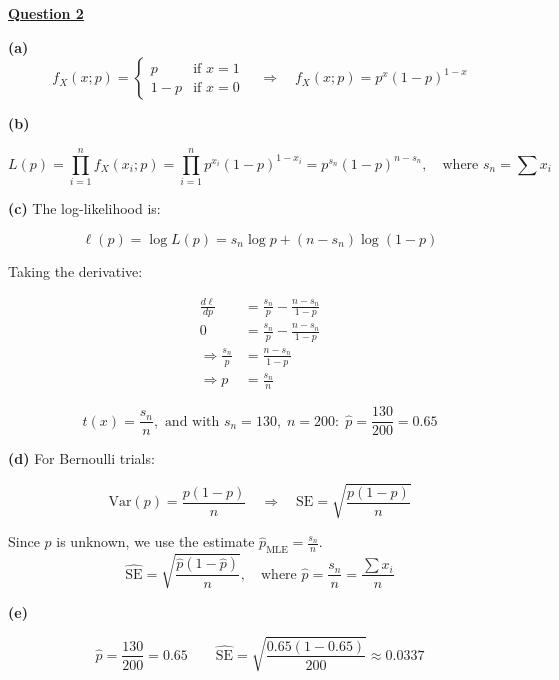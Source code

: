\documentclass[12pt]{article}
\begin{document}
\noindent{}

\vspace{1em}
\noindent\textbf{\underline{Question 2}}\par

\vspace{0.5em}
\noindent\textbf{(a)}
\[
f_X(x; p) =
\begin{cases}
p & \text{if } x = 1 \\
1 - p & \text{if } x = 0
\end{cases}
\quad \Rightarrow \quad
f_X(x; p) = p^{x}(1 - p)^{1 - x}
\]

\noindent\textbf{(b)}

\[
L(p) = \prod_{i=1}^{n} f_X(x_i; p) = \prod_{i=1}^{n} p^{x_i}(1 - p)^{1 - x_i}
=\boxed{ p^{s_n}(1 - p)^{n - s_n}}, \quad \text{where } s_n = \sum x_i
\]

\noindent\textbf{(c)}
The log-likelihood is:

\[
\ell(p) = \log L(p) = s_n \log p + (n - s_n) \log(1 - p)
\]

Taking the derivative:

\begin{align*}
\frac{d\ell}{dp} &= \frac{s_n}{p} - \frac{n - s_n}{1 - p} \\
0 &= \frac{s_n}{p} - \frac{n - s_n}{1 - p} \\
\Rightarrow \frac{s_n}{p} &= \frac{n - s_n}{1 - p} \\\Rightarrow p &= \frac{s_n}{n}
\end{align*}




\[
\boxed{t(x) = \frac{s_n}{n}, \text{ and with } s_n = 130, \; n = 200:\; \hat{p} = \frac{130}{200} = 0.65}
\]



\noindent\textbf{(d)}
For Bernoulli trials:

\[
\text{Var}(p) = \frac{p(1 - p)}{n} \quad \Rightarrow \quad
\text{SE} = \sqrt{ \frac{p(1 - p)}{n} }
\]


Since $p$ is unknown, we use the estimate $\hat{p}_{\text{MLE}} = \frac{s_n}{n}$.
\[
\boxed{
\widehat{\text{SE}} = \sqrt{ \frac{\hat{p}(1 - \hat{p})}{n} }, \quad \text{where } \hat{p} = \frac{s_n}{n} = \frac{\sum x_i}{n}
}
\]

\noindent\textbf{(e)}

\[
\hat{p} = \frac{130}{200} = 0.65
\qquad
\widehat{\text{SE}} = \sqrt{ \frac{0.65(1 - 0.65)}{200} } \approx 0.0337
\]
\end{document}
